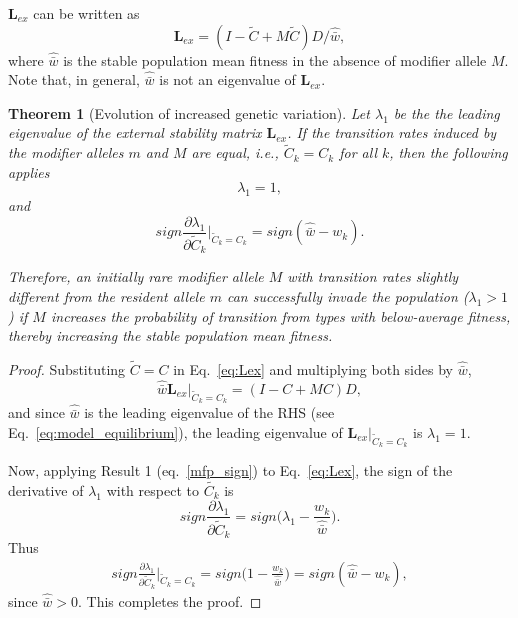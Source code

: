 \documentclass[9pt, a4paper, twocolumn]{extarticle}
\newtheorem{theorem}{Theorem}
\newcommand{\cl}{\mathbf{L}}
\begin{document}
$\cl_{ex}$ can be written as
\begin{equation}\label{eq:Lex}
\cl_{ex} = (I - \tilde{C} + M \tilde{C}) D /\hat{\bar w},
\end{equation}
where $\hat{\bar w}$ is the stable population mean fitness in the absence of modifier allele $M$.
Note that, in general, $\hat{\bar w}$ is not an eigenvalue of $\cl_{ex}$.

\begin{theorem}[Evolution of increased genetic variation]
Let $\lambda_1$ be the the leading eigenvalue of the external stability matrix $\cl_{ex}$.
If the transition rates induced by the modifier alleles $m$ and $M$ are equal, i.e., $\tilde{C}_k=C_k$ for all $k$, then the following applies
\begin{equation}
\lambda_1=1,
\end{equation}
and
\begin{equation}
sign \frac{\partial \lambda_1}{\partial \tilde{C}_k}\bigg\rvert_{\tilde{C}_k = C_k} = 
sign(\hat{\bar w} - w_k).
\end{equation}

Therefore, an initially rare modifier allele $M$ with transition rates slightly different from the resident allele $m$ can successfully invade the population ($\lambda_1>1$) if $M$ increases the probability of transition from types with below-average fitness, thereby increasing the stable population mean fitness.
\end{theorem}

\begin{proof}
Substituting $\tilde{C}=C$ in Eq.~\ref{eq:Lex} and multiplying both sides by $\hat{\bar w}$,
\begin{equation}
\hat{\bar w} \cl_{ex}\big\rvert_{\tilde{C}_k = C_k} = (I-C+MC) D,
\end{equation}
and since $\hat{\bar w}$ is the leading eigenvalue of the RHS (see Eq.~\ref{eq:model_equilibrium}),
the leading eigenvalue of $\cl_{ex}\big\rvert_{\tilde{C}_k = C_k}$ is $\lambda_1=1$.

Now, applying Result 1 (eq.~\ref{mfp_sign}) to Eq.~\ref{eq:Lex}, the sign of the derivative of $\lambda_1$ with respect to $\tilde{C_k}$ is
\begin{equation}
sign \frac{\partial \lambda_1}{\partial \tilde{C}_k} =
sign\Big(\lambda_1 - \frac{w_k}{\hat{\bar w}}\Big).
\end{equation}
Thus
\begin{multline}
sign \frac{\partial \lambda_1}{\partial \tilde{C}_k}\bigg\rvert_{\tilde{C}_k = C_k} = 
sign\Big(1 - \frac{w_k}{\hat{\bar w}}\Big) =  
sign(\hat{\bar w} - w_k),
\end{multline}
since $\hat{\bar w}>0$.
This completes the proof.
\end{proof}
\end{document}
